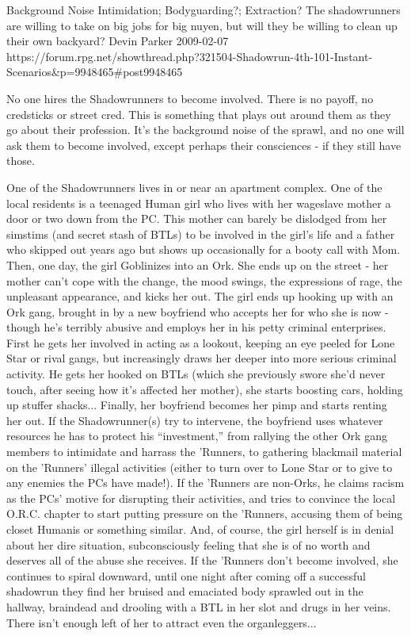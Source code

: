 \begin{scenario}{Background Noise}
	{Intimidation; Bodyguarding?; Extraction?}
	{The shadowrunners are willing to take on big jobs for big nuyen, but will they be willing to clean up their own backyard?}
	{Devin Parker}
	{2009-02-07}
	{https://forum.rpg.net/showthread.php?321504-Shadowrun-4th-101-Instant-Scenarios\&p=9948465#post9948465}

No one hires the Shadowrunners to become involved. There is no payoff, no credsticks or street cred. This is something that plays out around them as they go about their profession. It's the background noise of the sprawl, and no one will ask them to become involved, except perhaps their consciences - if they still have those.

\synopsis One of the Shadowrunners lives in or near an apartment complex. One of the local residents is a teenaged Human girl who lives with her wageslave mother a door or two down from the PC. This mother can barely be dislodged from her simstims (and secret stash of BTLs) to be involved in the girl's life and a father who skipped out years ago but shows up occasionally for a booty call with Mom. Then, one day, the girl Goblinizes into an Ork. She ends up on the street - her mother can't cope with the change, the mood swings, the expressions of rage, the unpleasant appearance, and kicks her out. The girl ends up hooking up with an Ork gang, brought in by a new boyfriend who accepts her for who she is now - though he's terribly abusive and employs her in his petty criminal enterprises. First he gets her involved in acting as a lookout, keeping an eye peeled for Lone Star or rival gangs, but increasingly draws her deeper into more serious criminal activity. He gets her hooked on BTLs (which she previously swore she'd never touch, after seeing how it's affected her mother), she starts boosting cars, holding up stuffer shacks... Finally, her boyfriend becomes her pimp and starts renting her out. If the Shadowrunner(s) try to intervene, the boyfriend uses whatever resources he has to protect his ``investment,'' from rallying the other Ork gang members to intimidate and harrass the 'Runners, to gathering blackmail material on the 'Runners' illegal activities (either to turn over to Lone Star or to give to any enemies the PCs have made!). If the 'Runners are non-Orks, he claims racism as the PCs' motive for disrupting their activities, and tries to convince the local O.R.C. chapter to start putting pressure on the 'Runners, accusing them of being closet Humanis or something similar. And, of course, the girl herself is in denial about her dire situation, subconsciously feeling that she is of no worth and deserves all of the abuse she receives. If the 'Runners don't become involved, she continues to spiral downward, until one night after coming off a successful shadowrun they find her bruised and emaciated body sprawled out in the hallway, braindead and drooling with a BTL in her slot and drugs in her veins. There isn't enough left of her to attract even the organleggers...


\end{scenario}
